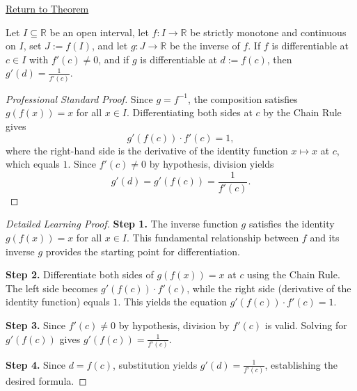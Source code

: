 \newpage
{}
\label{prf:derivative-inverse-function-at-point}

\begin{remark*}[Return]
\hyperref[thm:inverse-function-theorem-monotone]{Return to Theorem}
\end{remark*}

\begin{theorem*}
Let $I \subseteq \mathbb{R}$ be an open interval, let $f : I \to \mathbb{R}$
be strictly monotone and continuous on $I$, set $J := f(I)$, and let
$g : J \to \mathbb{R}$ be the inverse of $f$. If $f$ is differentiable
at $c \in I$ with $f'(c) \neq 0$, and if $g$ is differentiable at
$d := f(c)$, then $g'(d) = \frac{1}{f'(c)}$.
\end{theorem*}

\begin{proof}[Professional Standard Proof]
\LRAProofBodyStart
Since $g = f^{-1}$, the composition satisfies $g(f(x)) = x$ for all $x \in I$.
Differentiating both sides at $c$ by the Chain Rule gives
\[
  g'(f(c)) \cdot f'(c) = 1,
\]
where the right-hand side is the derivative of the identity function
$x \mapsto x$ at $c$, which equals $1$. Since $f'(c) \neq 0$ by hypothesis, 
division yields
\[
  g'(d) = g'(f(c)) = \frac{1}{f'(c)}.
\]
\end{proof}

\begin{proof}[Detailed Learning Proof]
\LRAProofBodyStart

\textbf{Step 1.} The inverse function $g$ satisfies the identity $g(f(x)) = x$ for all $x \in I$. This fundamental relationship between $f$ and its inverse $g$ provides the starting point for differentiation.

\textbf{Step 2.} Differentiate both sides of $g(f(x)) = x$ at $c$ using the Chain Rule. The left side becomes $g'(f(c)) \cdot f'(c)$, while the right side (derivative of the identity function) equals $1$. This yields the equation $g'(f(c)) \cdot f'(c) = 1$.

\textbf{Step 3.} Since $f'(c) \neq 0$ by hypothesis, division by $f'(c)$ is valid. Solving for $g'(f(c))$ gives $g'(f(c)) = \frac{1}{f'(c)}$.

\textbf{Step 4.} Since $d = f(c)$, substitution yields $g'(d) = \frac{1}{f'(c)}$, establishing the desired formula.
\end{proof}

